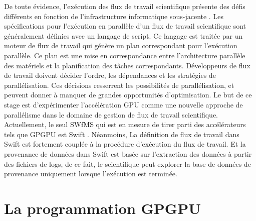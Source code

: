 De toute évidence, l'exécution des flux de travail scientifique présente des défis différents en fonction de l'infrastructure informatique sous-jacente \cite{bux}. 
Les spécifications pour l'exécution en parallèle d'un flux de travail scientifique sont généralement définies avec un langage de script. Ce langage est traitée par un moteur de flux de travail qui génère un plan correspondant pour l'exécution parallèle. Ce plan est une mise en correspondance entre l'architecture parallèle des matériels et la planification des tâches correspondants. Développeurs de flux de travail doivent décider l'ordre, les dépendances et les stratégies de parallélisation. Ces décisions resserrent les possibilités de parallélisation, et peuvent donner à manquer de grandes opportunités d'optimisation.
 Le but de ce stage est d'expérimenter l'accélération GPU comme une nouvelle approche de parallélisme dans le domaine de gestion de flux de travail scientifique. Actuellement, le seul SWfMS qui est en mesure de tirer parti des accélérateurs tels que GPGPU est Swift \cite{kri}. Néanmoins, %
La définition de flux de travail dans Swift est fortement couplée à la procédure d'exécution du flux de travail. Et la provenance de données dans Swift est basée sur l'extraction des données à partir des fichiers de logs, de ce fait, le scientifique peut explorer la base de données de provenance uniquement lorsque l'exécution est terminée.
			
		
	

\vspace{0.5cm}
\section{La programmation GPGPU}
 
